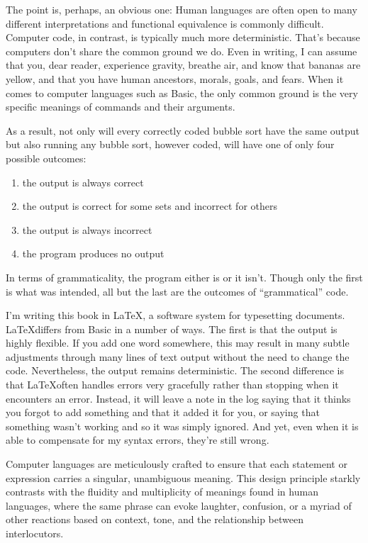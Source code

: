 The point is, perhaps, an obvious one: Human languages are often open to many different interpretations and functional equivalence is commonly difficult. Computer code, in contrast, is typically much more deterministic. That's because computers don't share the common ground we do. Even in writing, I can assume that you, dear reader, experience gravity, breathe air, and know that bananas are yellow, and that you have human ancestors, morals, goals, and fears. When it comes to computer languages such as Basic, the only common ground is the very specific meanings of commands and their arguments. 

As a result, not only will every correctly coded bubble sort have the same output but also running any bubble sort, however coded, will have one of only four possible outcomes:

\begin{enumerate}
    \item the output is always correct
    \item the output is correct for some sets and incorrect for others
    \item the output is always incorrect
    \item the program produces no output
\end{enumerate}

In terms of grammaticality, the program either is or it isn't. Though only the first is what was intended, all but the last are the outcomes of \enquote{grammatical} code.

I'm writing this book in \LaTeX, a software system for typesetting documents. \LaTeX differs from Basic in a number of ways. The first is that the output is highly flexible. If you add one word somewhere, this may result in many subtle adjustments through many lines of text output without the need to change the code. Nevertheless, the output remains deterministic. The second difference is that \LaTeX often handles errors very gracefully rather than stopping when it encounters an error. Instead, it will leave a note in the log saying that it thinks you forgot to add something and that it added it for you, or saying that something wasn't working and so it was simply ignored. And yet, even when it is able to compensate for my syntax errors, they're still wrong.

Computer languages are meticulously crafted to ensure that each statement or expression carries a singular, unambiguous meaning. This design principle starkly contrasts with the fluidity and multiplicity of meanings found in human languages, where the same phrase can evoke laughter, confusion, or a myriad of other reactions based on context, tone, and the relationship between interlocutors.

